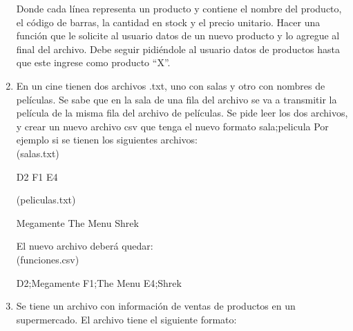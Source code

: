 \documentclass[
  letterpaper,
  DIV=11,
  numbers=noendperiod]{scrreprt}
\newenvironment{Shaded}{\begin{snugshade}}{\end{snugshade}}
\newcommand{\ExtensionTok}[1]{\textcolor[rgb]{0.00,0.23,0.31}{#1}}
\newcommand{\KeywordTok}[1]{\textcolor[rgb]{0.00,0.23,0.31}{#1}}
\newcommand{\NormalTok}[1]{\textcolor[rgb]{0.00,0.23,0.31}{#1}}
\begin{document}
\begin{enumerate}
  Donde cada línea representa un producto y contiene el nombre del
  producto, el código de barras, la cantidad en stock y el precio
  unitario. Hacer una función que le solicite al usuario datos de un
  nuevo producto y lo agregue al final del archivo. Debe seguir
  pidiéndole al usuario datos de productos hasta que este ingrese como
  producto ``X''.
\item
  En un cine tienen dos archivos .txt, uno con salas y otro con nombres
  de películas. Se sabe que en la sala de una fila del archivo se va a
  transmitir la película de la misma fila del archivo de películas. Se
  pide leer los dos archivos, y crear un nuevo archivo csv que tenga el
  nuevo formato sala;pelicula Por ejemplo si se tienen los siguientes
  archivos:\\

  (salas.txt)

\begin{Shaded}
\begin{Highlighting}[]
\ExtensionTok{D2}
\ExtensionTok{F1}
\ExtensionTok{E4}
\end{Highlighting}
\end{Shaded}

  (peliculas.txt)

\begin{Shaded}
\begin{Highlighting}[]
\ExtensionTok{Megamente}
\ExtensionTok{The}\NormalTok{ Menu}
\ExtensionTok{Shrek}
\end{Highlighting}
\end{Shaded}

  El nuevo archivo deberá quedar:\\
  (funciones.csv)

\begin{Shaded}
\begin{Highlighting}[]
\ExtensionTok{D2}\KeywordTok{;}\ExtensionTok{Megamente}
\ExtensionTok{F1}\KeywordTok{;}\ExtensionTok{The}\NormalTok{ Menu}
\ExtensionTok{E4}\KeywordTok{;}\ExtensionTok{Shrek}
\end{Highlighting}
\end{Shaded}
\item
  Se tiene un archivo con información de ventas de productos en un
  supermercado. El archivo tiene el siguiente formato:


\end{enumerate}
\end{document}
